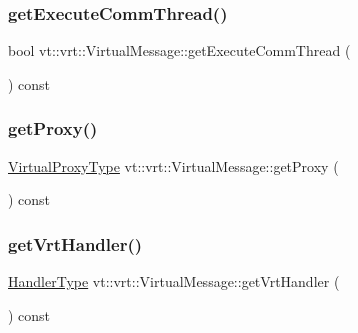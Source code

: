 \subsubsection{\texorpdfstring{get\+Execute\+Comm\+Thread()}{getExecuteCommThread()}}
{\footnotesize\ttfamily bool vt\+::vrt\+::\+Virtual\+Message\+::get\+Execute\+Comm\+Thread (\begin{DoxyParamCaption}{ }\end{DoxyParamCaption}) const\hspace{0.3cm}{\ttfamily [inline]}}

\mbox{\label{structvt_1_1vrt_1_1_virtual_message_a37cbc50547e033f049af3c9d289036cc}} 
\subsubsection{\texorpdfstring{get\+Proxy()}{getProxy()}}
{\footnotesize\ttfamily \hyperlink{namespacevt_a1b417dd5d684f045bb58a0ede70045ac}{Virtual\+Proxy\+Type} vt\+::vrt\+::\+Virtual\+Message\+::get\+Proxy (\begin{DoxyParamCaption}{ }\end{DoxyParamCaption}) const\hspace{0.3cm}{\ttfamily [inline]}}

\mbox{\label{structvt_1_1vrt_1_1_virtual_message_aaa41fe4b317b868fdcceb7c119feec9c}} 
\subsubsection{\texorpdfstring{get\+Vrt\+Handler()}{getVrtHandler()}}
{\footnotesize\ttfamily \hyperlink{namespacevt_af64846b57dfcaf104da3ef6967917573}{Handler\+Type} vt\+::vrt\+::\+Virtual\+Message\+::get\+Vrt\+Handler (\begin{DoxyParamCaption}{ }\end{DoxyParamCaption}) const\hspace{0.3cm}{\ttfamily [inline]}}

